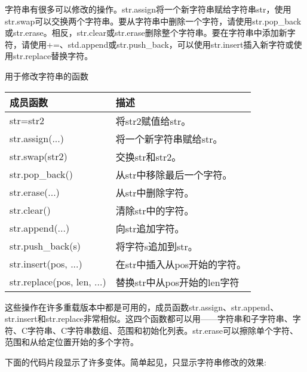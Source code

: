 
字符串有很多可以修改的操作。str.assign将一个新字符串赋给字符串str，使用str.swap可以交换两个字符串。要从字符串中删除一个字符，请使用str.pop\_back或str.erase。相反，str.clear或str.erase删除整个字符串。要在字符串中添加新字符，请使用+=、std.append或str.push\_back，可以使用str.insert插入新字符或使用str.replace替换字符。

\begin{center}
用于修改字符串的函数
\end{center}

\begin{longtable}[c]{|l|l|}
\hline
\textbf{成员函数}  & \textbf{描述}                                 \\ \hline
\endfirsthead
%
\endhead
%
str=str2                   & 将str2赋值给str。                                 \\ \hline
str.assign(...)            & 将一个新字符串赋给str。                         \\ \hline
str.swap(str2)             & 交换str和str2。                                  \\ \hline
str.pop\_back()            & 从str中移除最后一个字符。                 \\ \hline
str.erase(...)             & 从str中删除字符。                         \\ \hline
str.clear()                & 清除str中的字符。                                      \\ \hline
str.append(...)            & 向str追加字符。                           \\ \hline
str.push\_back(s)          & 将字符s追加到str。                     \\ \hline
str.insert(pos, ...)       & 在str中插入从pos开始的字符。           \\ \hline
str.replace(pos, len, ...) & 替换str中从pos开始的len字符 \\ \hline
\end{longtable}

这些操作在许多重载版本中都是可用的，成员函数str.assign、str.append、str.insert和str.replace非常相似。这四个函数都可以用——字符串和子字符串、字符、C字符串、C字符串数组、范围和初始化列表。str.erase可以擦除单个字符、范围和从给定位置开始的多个字符。

下面的代码片段显示了许多变体。简单起见，只显示字符串修改的效果:


